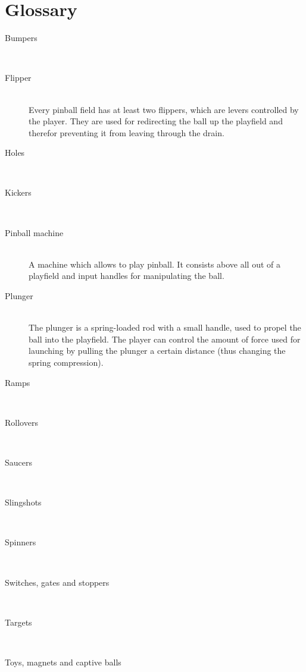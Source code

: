 \documentclass[fontsize=12pt,
               paper=a4,
               twoside=false,
               parskip=half,
               ]{scrartcl}
\begin{document}
\newcommand{\doctitle}{Glossary}


\section*{Glossary}

\begin{description}

\item[Bumpers] \hfill \\

\item[Flipper] \hfill \\
Every pinball field has at least two flippers, which are levers controlled by the player. They are used for redirecting the ball up the playfield and therefor preventing it from leaving through the drain.

\item[Holes] \hfill \\

\item[Kickers] \hfill \\

\item[Pinball machine] \hfill \\
A machine which allows to play pinball. It consists above all out of a playfield and input handles for manipulating the ball.

\item[Plunger] \hfill \\
The plunger is a spring-loaded rod with a small handle, used to propel the ball into the playfield. The player can control the amount of force used for launching by pulling the plunger a certain distance (thus changing the spring compression). 

\item[Ramps] \hfill \\

\item[Rollovers] \hfill \\

\item[Saucers] \hfill \\

\item[Slingshots] \hfill \\

\item[Spinners] \hfill \\

\item[Switches, gates and stoppers] \hfill \\

\item[Targets] \hfill \\

\item[Toys, magnets and captive balls] \hfill \\

\end{description}
\end{document}

